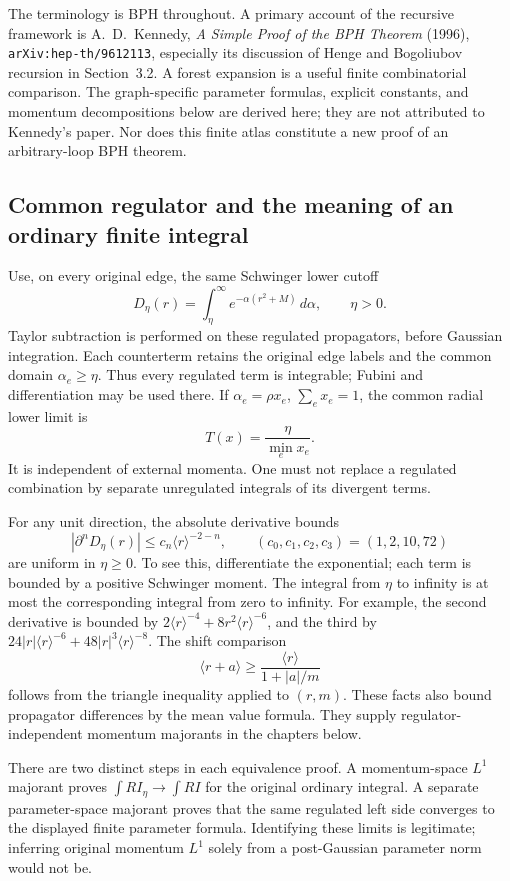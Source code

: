 The terminology is BPH throughout. A primary account of the recursive
framework is A.~D.~Kennedy, \emph{A Simple Proof of the BPH Theorem}
(1996), \texttt{arXiv:hep-th/9612113}, especially its discussion of Henge
and Bogoliubov recursion in Section~3.2. A forest expansion is a useful
finite combinatorial comparison. The graph-specific parameter formulas,
explicit constants, and momentum decompositions below are derived here;
they are not attributed to Kennedy's paper. Nor does this finite atlas
constitute a new proof of an arbitrary-loop BPH theorem.

\subsection{Common regulator and the meaning of an ordinary finite integral}

Use, on every original edge, the same Schwinger lower cutoff
\[
 D_\eta(r)=\int_\eta^\infty
             e^{-\alpha(r^2+M)}\,d\alpha,\qquad \eta>0.
\]
Taylor subtraction is performed on these regulated propagators, before
Gaussian integration. Each counterterm retains the original edge labels and
the common domain $\alpha_e\ge\eta$. Thus every regulated term is integrable;
Fubini and differentiation may be used there. If
$\alpha_e=\rho x_e$, $\sum_e x_e=1$, the common radial lower limit is
\[
 T(x)=\frac{\eta}{\min_e x_e}.
\]
It is independent of external momenta. One must not replace a regulated
combination by separate unregulated integrals of its divergent terms.

For any unit direction, the absolute derivative bounds
\[
 |\partial^nD_\eta(r)|\le c_n\langle r\rangle^{-2-n},\qquad
 (c_0,c_1,c_2,c_3)=(1,2,10,72)
\]
are uniform in $\eta\ge0$. To see this, differentiate the exponential;
each term is bounded by a positive Schwinger moment. The integral from
$\eta$ to infinity is at most the corresponding integral from zero to
infinity. For example, the second derivative is bounded by
$2\langle r\rangle^{-4}+8r^2\langle r\rangle^{-6}$, and the third by
$24|r|\langle r\rangle^{-6}+48|r|^3\langle r\rangle^{-8}$.
The shift comparison
\[
 \langle r+a\rangle\ge
 \frac{\langle r\rangle}{1+|a|/m}
\]
follows from the triangle inequality applied to $(r,m)$.
These facts also bound propagator differences by the mean value formula.
They supply regulator-independent momentum majorants in the chapters below.

There are two distinct steps in each equivalence proof. A momentum-space
$L^1$ majorant proves $\int RI_\eta\to\int RI$ for the original ordinary
integral. A separate parameter-space majorant proves that the same regulated
left side converges to the displayed finite parameter formula. Identifying
these limits is legitimate; inferring original momentum $L^1$ solely from a
post-Gaussian parameter norm would not be.

